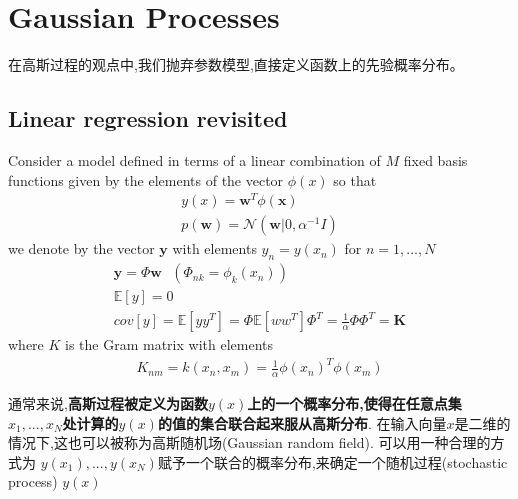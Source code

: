 \documentclass[a4paper]{article}
\begin{document}
\section{Gaussian Processes}
在高斯过程的观点中,我们抛弃参数模型,直接定义函数上的先验概率分布。

\subsection{Linear regression revisited}
Consider a model deﬁned in terms of a linear combination of $M$ ﬁxed basis functions given by the elements of the vector $\phi(x)$ so that
\begin{align}
y(x) = \mathbf{w}^T\phi(\mathbf{x})\\
p(\mathbf{w}) = \mathcal{N} (\mathbf{w}|0, \alpha^{-1}\mathit{I})
\end{align}
we denote by the vector $\mathbf{y}$ with elements $y_n = y(x_n)$ for $n = 1,...,N$
\begin{align}
\mathbf{y} = \Phi \mathbf{w} \text{ $(\Phi_{nk} = \phi_k(x_n)) $ }\\
\mathbb{E}[y] = 0\\
cov[y] = \mathbb{E}[yy^T] = \Phi \mathbb{E}[ww^T] \Phi^T=
  \frac{1}{\alpha}\Phi\Phi^T = \mathbf{K}
\end{align}
where $K$ is the Gram matrix with elements
\begin{align}
\mathit{K}_{nm} = k(x_n, x_m) = \frac{1}{\alpha} \phi(x_n)^T\phi(x_m)
\end{align}

通常来说,\textbf{高斯过程被定义为函数$y(x)$上的一个概率分布,使得在任意点集$x_1,...,x_N$处计算的$y(x)$的值的集合联合起来服从高斯分布}.
在输入向量$x$是二维的情况下,这也可以被称为高斯随机场(Gaussian random field).
可以用一种合理的方式为 $y(x_1),...,y(x_N)$赋予一个联合的概率分布,来确定一个随机过程(stochastic process) $y(x)$
\end{document}
